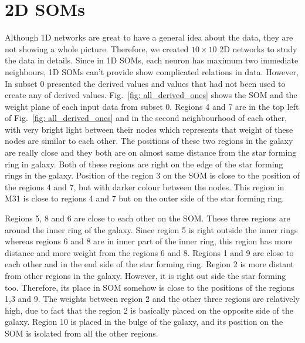  \section{2D SOMs}
 Although 1D networks are great to have a general idea about the data, they are not showing a whole picture. 
        Therefore, we created $10\times10$ 2D networks to study the data in details.
 Since in 1D SOMs, each neuron has maximum two immediate neighbours, 1D SOMs can't provide show complicated relations in data.
However, 
            In subset 0 presented the derived values and values that had not been used to create any of derived values.
            Fig.~\ref{fig: all_derived_ones} shows the SOM and the weight plane of each input data from subset 0.
            Regions 4 and 7 are in the top left of Fig.~\ref{fig: all_derived_ones} and in the second neighbourhood of each other, with very bright light between their nodes which represents that weight of these nodes are similar to each other. 
            The positions of these two regions in the galaxy are really close and they both are on almost same distance from the star forming ring in galaxy.
            Both of these regions are right on the edge of the star forming rings in the galaxy. 
            Position of the region 3 on the SOM is close to the position of the regions 4 and 7, but with darker colour between the nodes. 
            This region in M31 is close to regions 4 and 7 but on the outer side of the star forming ring.

            Regions 5, 8 and 6 are close to each other on the SOM.
            These three regions are around the inner ring of the galaxy.
            Since region 5 is right outside the inner rings whereas regions 6 and 8 are in inner part of the inner ring, this region has more distance and more weight from the regions 6 and 8.
            Regions 1 and 9 are close to each other and in the end side of the star forming ring. 
            Region 2 is more distant from other regions in the galaxy. 
            However, it is right out side the star forming too. 
            Therefore, its place in SOM somehow is close to the positions of the regions 1,3 and 9.
            The weights between region 2 and the other three regions are relatively high, due to fact that the region 2 is basically placed on the opposite side of the galaxy. 
            Region 10 is placed in the bulge of the galaxy, and its position on the SOM is isolated from all the other regions. 

